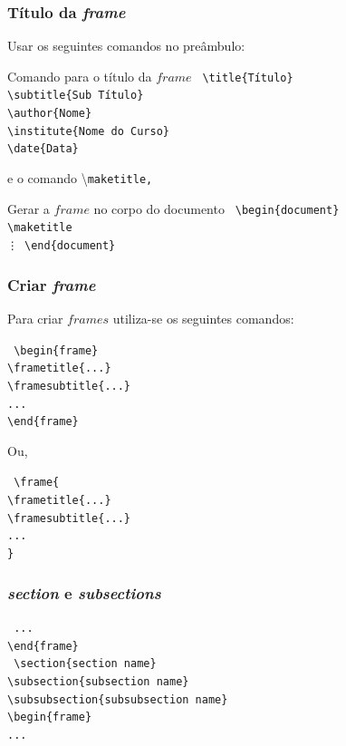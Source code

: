 \documentclass[article]{beamer}%
\begin{document}
\begin{frame}
\frametitle{Título da \emph{frame}}
Usar os seguintes comandos no preâmbulo:
\begin{block}{Comando para o título da $frame$}
\scriptsize{\tt{
\textbackslash title\{Título\} \\
\textbackslash subtitle\{Sub Título\} \\
\textbackslash author\{Nome\}\\
\textbackslash institute\{Nome do Curso\}\\
\textbackslash date\{Data\} \\
}}
\end{block}
e o comando \textbackslash \tt{maketitle}, 
\begin{block}{Gerar a $frame$ no corpo do documento}
\scriptsize{\tt{
\textbackslash begin\{document\} \\ 
\textbackslash maketitle\\ 
\vdots
\textbackslash end\{document\}\\
}}
\end{block}
\end{frame}

\begin{frame}
\frametitle{Criar \emph{frame}}
Para criar $frames$ utiliza-se os seguintes comandos:
\begin{block}{}
\scriptsize{\tt{
\textbackslash begin\{frame\} \\
\textbackslash frametitle\{...\} \\
\textbackslash framesubtitle\{...\} \\
...\\
\textbackslash end\{frame\}
}}
\end{block}
Ou, 
\begin{block}{}
\scriptsize{\tt{
\textbackslash frame\{ \\
\textbackslash frametitle\{...\}\\
\textbackslash framesubtitle\{...\}\\
...\\
\}
}}
\end{block}
\end{frame}

\begin{frame}
\frametitle{\emph{section} e \emph{subsections}}
\vspace{1cm}
\scriptsize{\tt{
...\\
\textbackslash end\{frame\}\\
\vspace{0.5cm}
\alert{
\textbackslash section\{section name\}\\
\textbackslash subsection\{subsection name\}\\
\textbackslash subsubsection\{subsubsection name\}}\\
\vspace{0.5cm}
\textbackslash begin\{frame\}\\
...\\
}
}
\end{frame}
\end{document}
